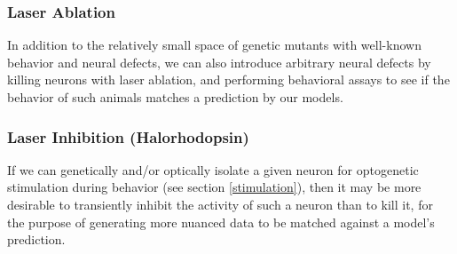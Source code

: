 \documentclass[letter,11pt]{article}
\begin{document}
\subsubsection{Laser Ablation}

In addition to the relatively small space of genetic mutants with well-known behavior and neural defects, we can also introduce arbitrary
neural defects by killing neurons with laser ablation, and performing behavioral assays to see if the behavior of such animals matches a
prediction by our models.

\subsubsection{Laser Inhibition (Halorhodopsin)}

If we can genetically and/or optically isolate a given neuron for optogenetic
stimulation during behavior (see section \ref{stimulation}), then it may be
more desirable to transiently inhibit the activity of such a neuron than to
kill it, for the purpose of generating more nuanced data to be matched against
a model's prediction.
\end{document}
